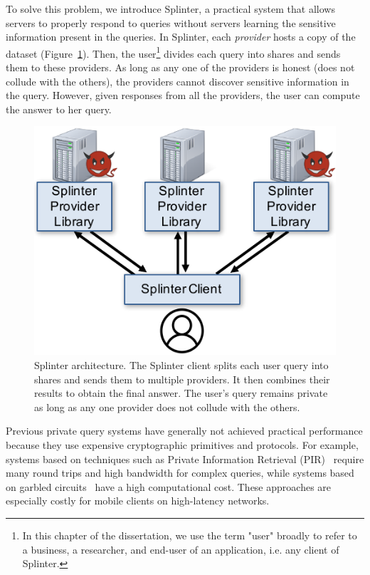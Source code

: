 To solve this problem, we introduce Splinter, a practical system that allows servers
to properly respond to queries without servers learning the sensitive information 
present in the queries. In Splinter, each \emph{provider} hosts a copy of the dataset (Figure~\ref{fig:overview}).
Then, the user\footnote{In this chapter of the dissertation, we use the term "user" broadly
to refer to a business, a researcher, and end-user of an application, i.e. any client of Splinter.} 
divides each query into shares and sends them to these providers.
As long as any one of the providers is honest (does not
collude with the others), the providers cannot discover sensitive
information in the query. However, given responses from all the providers, the user
can compute the answer to her query.

\begin{figure}
	\centering
	\includegraphics[width=\textwidth]{splinter-figs/overview.pdf}
	\caption[Overview of Splinter architecture.]{
		Splinter architecture. 
		The Splinter client splits each user query into shares and sends them to multiple
		providers. It then combines their results to obtain
		the final answer.
		The user's query remains private as long as any one provider does not collude with the others.
	}
	\label{fig:overview}
\end{figure}

Previous private query systems have generally not achieved practical performance
because they use expensive cryptographic primitives and protocols.
For example, systems based on techniques such
as Private Information Retrieval (PIR)~\cite{goldberg,chor1997private,pir-search} 
require many round trips and high bandwidth for complex queries, while systems based on garbled
circuits~\cite{wu2016,lan2016embark,ben2008fairplaymp} have a high computational cost.
These approaches are especially costly for mobile clients on high-latency networks.

